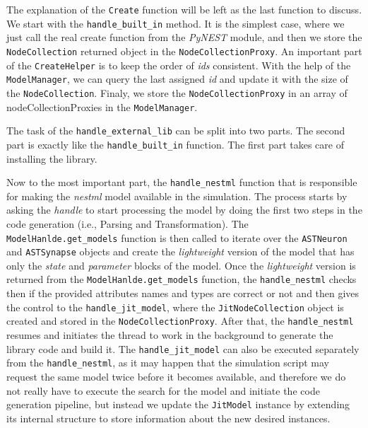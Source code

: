 The explanation of the \texttt{Create} function will be left as the last function to discuss. We start with the \texttt{handle\_built\_in} method. It is the simplest case, where we just call the real create function from the \emph{PyNEST} module, and then we store the \texttt{NodeCollection} returned object in the \texttt{NodeCollectionProxy}. An important part of the \texttt{CreateHelper} is to keep the order of \emph{ids} consistent. With the help of the \texttt{ModelManager}, we can query the last assigned \emph{id} and update it with the size of the \texttt{NodeCollection}. Finaly, we store the \texttt{NodeCollectionProxy} in an array of nodeCollectionProxies in the \texttt{ModelManager}.

The task of the \texttt{handle\_external\_lib} can be split into two parts. The second part is exactly like the \texttt{handle\_built\_in} function. The first part takes care of installing the library.

Now to the most important part, the \texttt{handle\_nestml} function that is responsible for making the \emph{nestml} model available in the simulation. The process starts by asking the \emph{handle} to start processing the model by doing the first two steps in the code generation (i.e., Parsing and Transformation). The \texttt{ModelHanlde.get\_models} function is then called to iterate over the \texttt{ASTNeuron} and \texttt{ASTSynapse} objects and create the \emph{lightweight} version of the model that has only the \emph{state} and \emph{parameter} blocks of the model. Once the \emph{lightweight} version is returned from the  \texttt{ModelHanlde.get\_models} function, the \texttt{handle\_nestml} checks then if the provided attributes names and types are correct or not and then gives the control to the \texttt{handle\_jit\_model}, where the \texttt{JitNodeCollection} object is created and stored in the \texttt{NodeCollectionProxy}. After that, the  \texttt{handle\_nestml} resumes and initiates the thread to work in the background to generate the library code and build it. The  \texttt{handle\_jit\_model} can also be executed separately from the  \texttt{handle\_nestml}, as it may happen that the simulation script may request the same model twice before it becomes available, and therefore we do not really have to execute the search for the model and initiate the code generation pipeline, but instead we update the \texttt{JitModel} instance by extending its internal structure to store information about the new desired instances.


